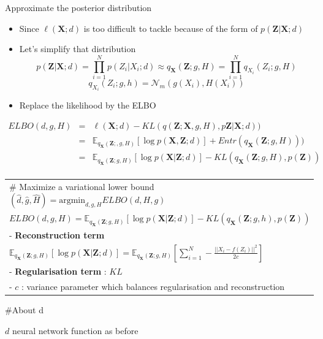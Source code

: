 \documentclass[
  ignorenonframetext,
]{beamer}
\begin{document}
\begin{frame}{Approximate the posterior distribution}
\protect\hypertarget{approximate-the-posterior-distribution}{}
\begin{itemize}
\item
  Since \(\ell(\mathbf{X}; d)\) is too difficult to tackle because of
  the form of \(p(\mathbf{Z} | \mathbf{X}; d)\)
\item
  Let's simplify that distribution
  \[p(\mathbf{Z}  | \mathbf{X};d) = \prod_{i=1}^{N} p(Z_i |  X_i; d)  \approx q_{\mathbf{X}}(\mathbf{Z};g,H)  = \prod_{i=1}^{N} q_{ X_i}(Z_i;g,H)\]
  \[q_{X_i}(Z_i;g,h) =\mathcal{N}_m(g(X_i),H(X_i))\]
\item
  Replace the likelihood by the ELBO
\end{itemize}

\[
\begin{eqnarray}
 ELBO(d,g,H) &=&\ell(\mathbf{X}; d)-  KL(q(\mathbf{Z};\mathbf{X},g,H), p\mathbf{Z} |\mathbf{X};d))\\
 &=&\mathbb{E}_{q_{\mathbf{X}}(\mathbf{Z}; ,g,H)}[\log p(\mathbf{X} , \mathbf{Z};d)] + Entr(q_{\mathbf{X}}(\mathbf{Z};g,H)))\\
 &=& \mathbb{E}_{q_{\mathbf{X}}(\mathbf{Z};g,H)}[\log p(\mathbf{X} | \mathbf{Z};d)]- KL(q_{\mathbf{X}}(\mathbf{Z};g,H), p(\mathbf{Z}))\\
\end{eqnarray}
 \]

\begin{longtable}[]{@{}
  >{\raggedright\arraybackslash}p{}@{}}
\toprule
\endhead
\# Maximize a variational lower bound
\((\hat{d},\hat{g},\hat{H}) = \mbox{argmin}_{d,g,H} ELBO(d,H,g)\) \\
\(ELBO(d,g,H)  = \mathbb{E}_{q_{\mathbf{X}}(\mathbf{Z};g,H)}[\log p(\mathbf{X} | \mathbf{Z};d)]- KL(q_{\mathbf{X}}(\mathbf{Z};g,h), p(\mathbf{Z}))\) \\
- \textbf{Reconstruction term} \\
\(\mathbb{E}_{q_{\mathbf{X}}(\mathbf{Z};g,H)}[\log p(\mathbf{X} | \mathbf{Z};d)] = \mathbb{E}_{q_{\mathbf{X}}(\mathbf{Z};g,H)}  \left[\sum_{i=1}^N - \frac{||X_i - f(Z_i)||^2}{2c}\right]\) \\
- \textbf{Regularisation term} : \(KL\) \\
- \(c\) : variance parameter which balances regularisation and
reconstruction \\
\bottomrule
\end{longtable}

\#About d

\(d\) neural network function as before
\end{frame}
\end{document}
